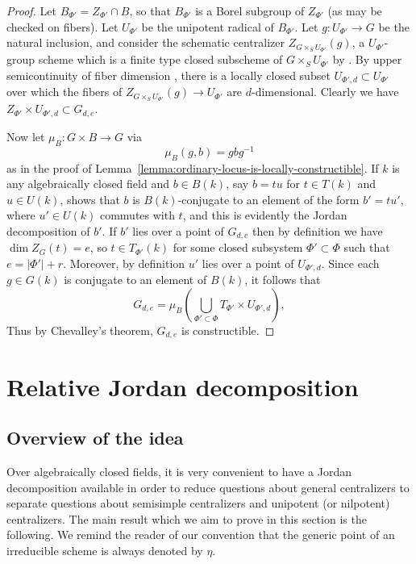 \documentclass[11pt,reqno]{amsart}
\theoremstyle{definition}
\begin{document}
\begin{proof}
Let $B_{\Phi'} = Z_{\Phi'} \cap B$, so that $B_{\Phi'}$ is a Borel subgroup of $Z_{\Phi'}$ (as may be checked on fibers). Let $U_{\Phi'}$ be the unipotent radical of $B_{\Phi'}$. Let $g: U_{\Phi'} \to G$ be the natural inclusion, and consider the schematic centralizer $Z_{G \times_S U_{\Phi'}}(g)$, a $U_{\Phi'}$-group scheme which is a finite type closed subscheme of $G \times_S U_{\Phi'}$ by \cite[Lem.\ 2.1]{Integral-Springer}. By upper semicontinuity of fiber dimension \cite[IV\textsubscript{3}, Thm.\ 13.1.3]{EGA}, there is a locally closed subset $U_{\Phi', d} \subset U_{\Phi'}$ over which the fibers of $Z_{G \times_S U_{\Phi'}}(g) \to U_{\Phi'}$ are $d$-dimensional. Clearly we have $Z_{\Phi'} \times U_{\Phi', d} \subset G_{d, e}$. \smallskip

Now let $\mu_B: G \times B \to G$ via
\[
\mu_B(g, b) = gbg^{-1}
\]
as in the proof of Lemma~\ref{lemma:ordinary-locus-is-locally-constructible}. If $k$ is any algebraically closed field and $b \in B(k)$, say $b = tu$ for $t \in T(k)$ and $u \in U(k)$, \cite[Lem.\ 2.12]{SteinbergReg} shows that $b$ is $B(k)$-conjugate to an element of the form $b' = tu'$, where $u' \in U(k)$ commutes with $t$, and this is evidently the Jordan decomposition of $b'$. If $b'$ lies over a point of $G_{d, e}$ then by definition we have $\dim Z_G(t) = e$, so $t \in T_{\Phi'}(k)$ for some closed subsystem $\Phi' \subset \Phi$ such that $e = |\Phi'| + r$. Moreover, by definition $u'$ lies over a point of $U_{\Phi', d}$. Since each $g \in G(k)$ is conjugate to an element of $B(k)$, it follows that
\[
G_{d,e} = \mu_B\left(\bigcup_{\Phi' \subset \Phi} T_{\Phi'} \times U_{\Phi', d}\right),
\]
Thus by Chevalley's theorem, $G_{d, e}$ is constructible.
\end{proof}














\section{Relative Jordan decomposition}\label{section:relative-jordan-decomposition}

\subsection{Overview of the idea}

Over algebraically closed fields, it is very convenient to have a Jordan decomposition available in order to reduce questions about general centralizers to separate questions about semisimple centralizers and unipotent (or nilpotent) centralizers. The main result which we aim to prove in this section is the following. We remind the reader of our convention that the generic point of an irreducible scheme is always denoted by $\eta$.
\end{document}
